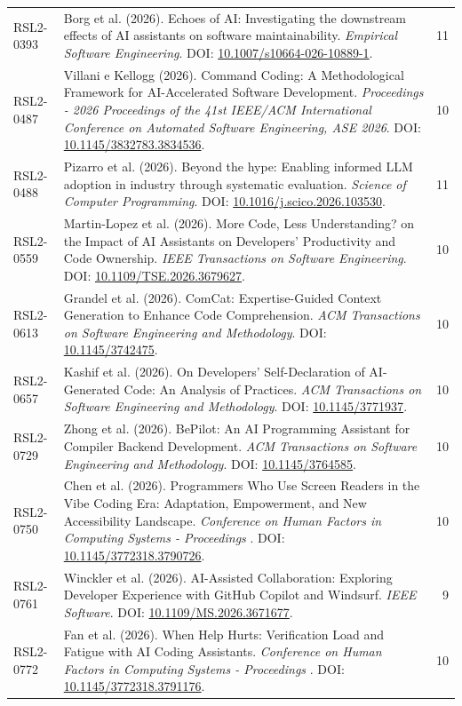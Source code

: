 \begin{small}
\begin{longtable}{lp{11.2cm}r}
RSL2-0393 & Borg et al. (2026). Echoes of AI: Investigating the downstream effects of AI assistants on software maintainability. \textit{Empirical Software Engineering}. DOI: \url{10.1007/s10664-026-10889-1}. & 11 \\
RSL2-0487 & Villani e Kellogg (2026). Command Coding: A Methodological Framework for AI-Accelerated Software Development. \textit{Proceedings - 2026 Proceedings of the 41st IEEE/ACM International Conference on Automated Software Engineering, ASE 2026}. DOI: \url{10.1145/3832783.3834536}. & 10 \\
RSL2-0488 & Pizarro et al. (2026). Beyond the hype: Enabling informed LLM adoption in industry through systematic evaluation. \textit{Science of Computer Programming}. DOI: \url{10.1016/j.scico.2026.103530}. & 11 \\
RSL2-0559 & Martin-Lopez et al. (2026). More Code, Less Understanding? on the Impact of AI Assistants on Developers' Productivity and Code Ownership. \textit{IEEE Transactions on Software Engineering}. DOI: \url{10.1109/TSE.2026.3679627}. & 10 \\
RSL2-0613 & Grandel et al. (2026). ComCat: Expertise-Guided Context Generation to Enhance Code Comprehension. \textit{ACM Transactions on Software Engineering and Methodology}. DOI: \url{10.1145/3742475}. & 10 \\
RSL2-0657 & Kashif et al. (2026). On Developers’ Self-Declaration of AI-Generated Code: An Analysis of Practices. \textit{ACM Transactions on Software Engineering and Methodology}. DOI: \url{10.1145/3771937}. & 10 \\
RSL2-0729 & Zhong et al. (2026). BePilot: An AI Programming Assistant for Compiler Backend Development. \textit{ACM Transactions on Software Engineering and Methodology}. DOI: \url{10.1145/3764585}. & 10 \\
RSL2-0750 & Chen et al. (2026). Programmers Who Use Screen Readers in the Vibe Coding Era: Adaptation, Empowerment, and New Accessibility Landscape. \textit{Conference on Human Factors in Computing Systems - Proceedings }. DOI: \url{10.1145/3772318.3790726}. & 10 \\
RSL2-0761 & Winckler et al. (2026). AI-Assisted Collaboration: Exploring Developer Experience with GitHub Copilot and Windsurf. \textit{IEEE Software}. DOI: \url{10.1109/MS.2026.3671677}. & 9 \\
RSL2-0772 & Fan et al. (2026). When Help Hurts: Verification Load and Fatigue with AI Coding Assistants. \textit{Conference on Human Factors in Computing Systems - Proceedings }. DOI: \url{10.1145/3772318.3791176}. & 10 \\

\end{longtable}
\end{small}
